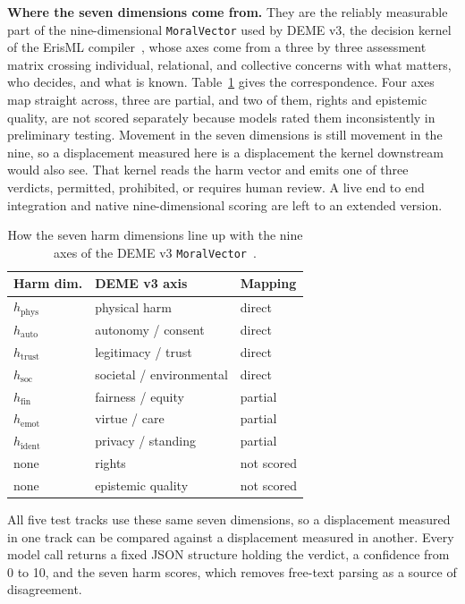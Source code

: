 \documentclass[conference]{IEEEtran}
\begin{document}
\textbf{Where the seven dimensions come from.} They are the reliably measurable part of the nine-dimensional \texttt{MoralVector} used by DEME v3, the decision kernel of the ErisML compiler~\cite{erisml_compiler}, whose axes come from a three by three assessment matrix crossing individual, relational, and collective concerns with what matters, who decides, and what is known. Table~\ref{tab:deme} gives the correspondence. Four axes map straight across, three are partial, and two of them, rights and epistemic quality, are not scored separately because models rated them inconsistently in preliminary testing. Movement in the seven dimensions is still movement in the nine, so a displacement measured here is a displacement the kernel downstream would also see. That kernel reads the harm vector and emits one of three verdicts, permitted, prohibited, or requires human review. A live end to end integration and native nine-dimensional scoring are left to an extended version.

\begin{table}[htbp]
\caption{How the seven harm dimensions line up with the nine axes of the DEME v3 \texttt{MoralVector}~\cite{erisml_compiler}.}
\label{tab:deme}
\centering
\footnotesize
\begin{tabular}{@{}lll@{}}
\toprule
\textbf{Harm dim.} & \textbf{DEME v3 axis} & \textbf{Mapping} \\
\midrule
$h_\text{phys}$ & physical harm & direct \\
$h_\text{auto}$ & autonomy / consent & direct \\
$h_\text{trust}$ & legitimacy / trust & direct \\
$h_\text{soc}$ & societal / environmental & direct \\
$h_\text{fin}$ & fairness / equity & partial \\
$h_\text{emot}$ & virtue / care & partial \\
$h_\text{ident}$ & privacy / standing & partial \\
none & rights & not scored \\
none & epistemic quality & not scored \\
\bottomrule
\end{tabular}
\end{table}

All five test tracks use these same seven dimensions, so a displacement measured in one track can be compared against a displacement measured in another. Every model call returns a fixed JSON structure holding the verdict, a confidence from 0 to 10, and the seven harm scores, which removes free-text parsing as a source of disagreement.
\end{document}
